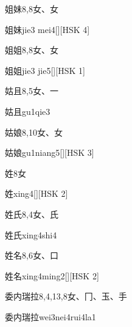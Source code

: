 \begin{entry}{姐妹}{8,8}{⼥、⼥}
  \begin{phonetics}{姐妹}{jie3 mei4}[][HSK 4]
  \end{phonetics}
\end{entry}

\begin{entry}{姐姐}{8,8}{⼥、⼥}
  \begin{phonetics}{姐姐}{jie3 jie5}[][HSK 1]
  \end{phonetics}
\end{entry}

\begin{entry}{姑且}{8,5}{⼥、⼀}
  \begin{phonetics}{姑且}{gu1qie3}
  \end{phonetics}
\end{entry}

\begin{entry}{姑娘}{8,10}{⼥、⼥}
  \begin{phonetics}{姑娘}{gu1niang5}[][HSK 3]
  \end{phonetics}
\end{entry}

\begin{entry}{姓}{8}{⼥}
  \begin{phonetics}{姓}{xing4}[][HSK 2]
  \end{phonetics}
\end{entry}

\begin{entry}{姓氏}{8,4}{⼥、⽒}
  \begin{phonetics}{姓氏}{xing4shi4}
  \end{phonetics}
\end{entry}

\begin{entry}{姓名}{8,6}{⼥、⼝}
  \begin{phonetics}{姓名}{xing4ming2}[][HSK 2]
  \end{phonetics}
\end{entry}

\begin{entry}{委内瑞拉}{8,4,13,8}{⼥、⼌、⽟、⼿}
  \begin{phonetics}{委内瑞拉}{wei3nei4rui4la1}
  \end{phonetics}
\end{entry}

